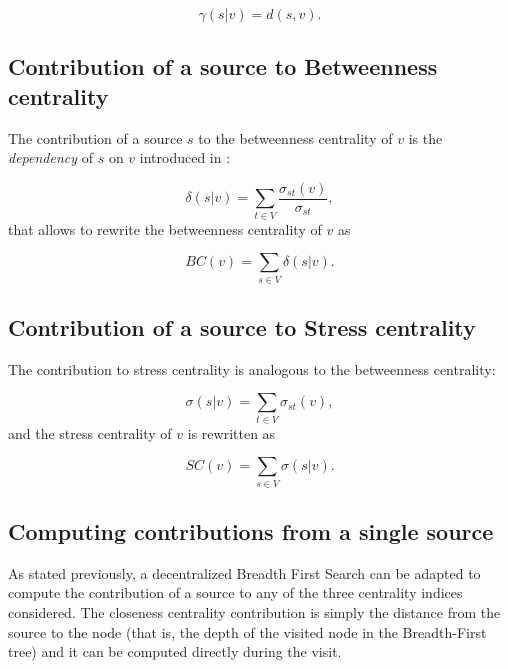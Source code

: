 \begin{equation}
\gamma(s|v) = d(s,v) .
\end{equation}

\subsection*{Contribution of a source to Betweenness centrality}

The contribution of a source $s$ to the betweenness centrality of $v$ is the \emph{dependency} of $s$ on $v$ introduced in \cite{brandes2001}:

\begin{equation}
\delta(s|v) = \sum_{t \in V} \frac{\sigma_{st}(v)}{\sigma_{st}},
\end{equation}
that allows to rewrite the betweenness centrality of $v$ as

\begin{equation*}
BC(v) = \sum_{s \in V} \delta(s|v).
\end{equation*}

\subsection*{Contribution of a source to Stress centrality}

The contribution to stress centrality is analogous to the betweenness centrality:

\begin{equation}
\sigma(s|v) = \sum_{t \in V} \sigma_{st}(v),
\end{equation}
and the stress centrality of $v$ is rewritten as

\begin{equation*}
SC(v) = \sum_{s \in V} \sigma(s|v).
\end{equation*}

\subsection{Computing contributions from a single source}
\label{sec:recursive}

As stated previously, a decentralized Breadth First Search can be adapted to compute the contribution of a source to any of the three centrality indices considered. The closeness centrality contribution is simply the distance from the source to the node (that is, the depth of the visited node in the Breadth-First tree) and it can be computed directly during the visit.

